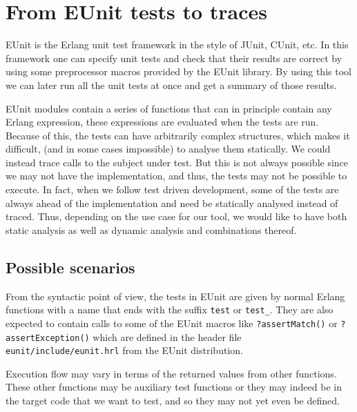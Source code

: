\documentclass[]{sigplanconf}
\begin{document}
\section{From EUnit tests to traces}
\label{EunitToTraces}

EUnit \cite{eunit,eunit_user_guide} is the Erlang unit test framework in the
style of JUnit, CUnit, etc. In this framework one can specify unit tests
and check that their results are correct by using some preprocessor macros
provided by the EUnit library. By using this tool we can later run all
the unit tests at once and get a summary of those results.

EUnit modules contain a series of functions that can in principle
contain any Erlang expression, these expressions are
evaluated when the tests are run. Because of this, the tests
can have arbitrarily complex structures, which makes it difficult, (and
in some cases impossible) to analyse them statically. We could instead
trace calls to the subject under test. But this is not always possible since we may not have
the implementation, and thus, the tests may not be possible to execute.
In fact, when we follow test driven development, some of the tests are always ahead
of the implementation and need be statically analysed instead of traced.
Thus, depending on the use case for our tool, we would
like to have both static analysis as well as dynamic analysis and combinations
thereof. 

\subsection{Possible scenarios}

From the syntactic point of view, the tests in EUnit are given by
normal Erlang functions with a name that ends with the suffix \texttt{test}
or \texttt{test\_}. They are also expected to contain calls to some of the EUnit macros
like \texttt{?assertMatch()} or \texttt{?assertException()} which are
defined in the header file \texttt{eunit/include/eunit.hrl} from the
EUnit distribution.

Execution flow may vary in terms of the returned values
from other functions. These other functions may be auxiliary test functions or they may indeed be in the target code that we want to test,
and so they may not yet even be
defined.
\end{document}
